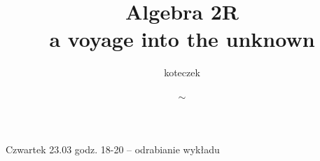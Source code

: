 \documentclass{article}
\title{Algebra 2R\smallskip\\{\scriptsize a voyage into the unknown}}
\author{koteczek}
\date{$\sim$}
\begin{document}
\maketit

Czwartek 23.03 godz. 18-20 -- odrabianie wykładu












\tableofcontents

\newpage
\end{document}
